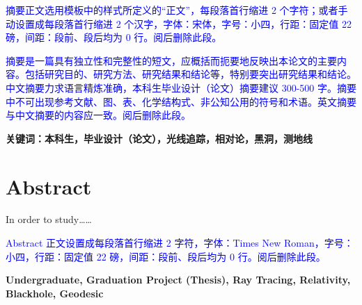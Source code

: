 \textcolor{blue}{摘要正文选用模板中的样式所定义的“正文”，每段落首行缩进 2 个字符；或者手动设置成每段落首行缩进 2 个汉字，字体：宋体，字号：小四，行距：固定值 22 磅，间距：段前、段后均为 0 行。阅后删除此段。}

\textcolor{blue}{摘要是一篇具有独立性和完整性的短文，应概括而扼要地反映出本论文的主要内容。包括研究目的、研究方法、研究结果和结论等，特别要突出研究结果和结论。中文摘要力求语言精炼准确，本科生毕业设计（论文）摘要建议 300-500 字。摘要中不可出现参考文献、图、表、化学结构式、非公知公用的符号和术语。英文摘要与中文摘要的内容应一致。阅后删除此段。}

\vspace{4ex}\noindent\textbf{\heiti 关键词：本科生，毕业设计（论文），光线追踪，相对论，黑洞，测地线}
\newpage

\topskip=0pt

\vspace*{2mm}

\begin{spacing}{0.95}
  \centering
  \heiti{}\textbf{\thesisTitleEN}
\end{spacing}

\vspace*{17mm}

{\let\clearpage\relax \chapter*{
  \textmd{Abstract}\vskip -3bp}}
\setcounter{page}{2}

\setlength{\parskip}{0em}

In order to study……

\textcolor{blue}{Abstract 正文设置成每段落首行缩进 2 字符，字体：Times New Roman，字号：小四，行距：固定值 22 磅，间距：段前、段后均为 0 行。阅后删除此段。}

\vspace{3ex}\noindent\textbf{Undergraduate, Graduation Project (Thesis), Ray Tracing, Relativity, Blackhole, Geodesic}
\newpage
